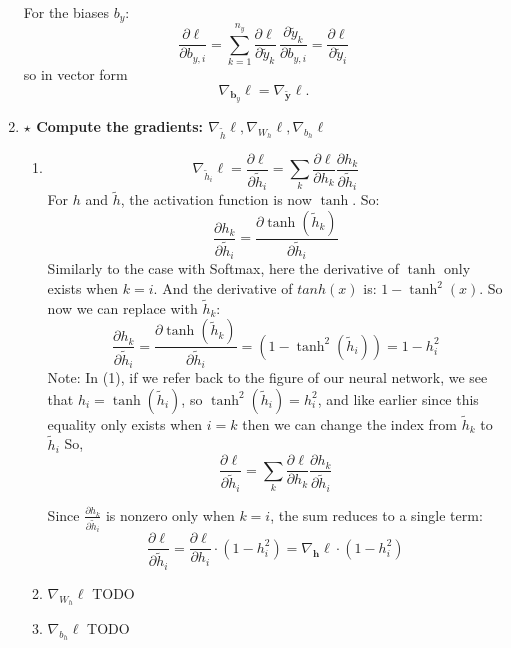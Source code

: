 \documentclass[12pt,a4paper]{article}
\begin{document}
\begin{enumerate}[resume]
    For the biases $b_y$:
    \[
    \frac{\partial \ell}{\partial b_{y,i}}
    = \sum_{k=1}^{n_y} \frac{\partial \ell}{\partial \tilde{y}_k}\,\frac{\partial \tilde{y}_k}{\partial b_{y,i}}
    = \frac{\partial \ell}{\partial \tilde{y}_i}
    \]
    so in vector form
    \[
    \nabla_{\mathbf{b}_y}\ell = \nabla_{\tilde{\mathbf{y}}}\ell .
    \]

    \item \textbf{$\star$ Compute the gradients: $\nabla_{\tilde{h}}\ell, \nabla_{W_h}\ell, \nabla_{b_h}\ell$}

    \begin{enumerate}
        \item \[ 
        \nabla_{\tilde{h}_i}\ell = \frac{\partial \ell}{\partial \tilde{h}_i}  
        = \sum_{k} \frac{\partial \ell}{\partial h_k} \frac{\partial h_k}{\partial \tilde{h}_i}
        \]
        For $h$ and $\tilde{h}$, the activation function is now $\tanh$. So:
        \[
        \frac{\partial h_k}{\partial \tilde{h}_i} = \frac{\partial \tanh(\tilde{h}_k)}{\partial \tilde{h}_i}
        \]
        Similarly to the case with Softmax, here the derivative of $\tanh$ only exists when $k=i$. And the derivative
        of $tanh(x)$ is: $1 - \tanh^2(x)$.
        So now we can replace with $\tilde{h}_k$:
        \[
        \frac{\partial h_k}{\partial \tilde{h}_i}
        = \frac{\partial \tanh(\tilde{h}_k)}{\partial \tilde{h}_i} \tag{1}
        = (1 - \tanh^2(\tilde{h}_i))
        = 1 - h_i^2
        \]
        Note: In (1), if we refer back to the figure of our neural network, we see that $h_i = \tanh(\tilde{h}_i)$, so $\tanh^2(\tilde{h}_i) = h_i^2$, 
        and like earlier since this equality only exists when $i=k$ then we can change the index 
        from $\tilde{h}_k$ to $\tilde{h}_i$ \newline
        So,
        \[
        \frac{\partial \ell}{\partial \tilde{h}_i}
        = \sum_k \frac{\partial \ell}{\partial h_k} \frac{\partial h_k}{\partial \tilde{h}_i}
        \]

        Since $\frac{\partial h_k}{\partial \tilde{h}_i}$ is nonzero only when $k = i$, the sum reduces to a single term:
        \[
        \frac{\partial \ell}{\partial \tilde{h}_i}
        = \frac{\partial \ell}{\partial h_i} \cdot (1 - h_i^2) 
        = \nabla_{\mathbf{h}}\ell \cdot (1 - h_i^2) 
        \]
        
        \item $\nabla_{W_h}\ell$ TODO
        \item $\nabla_{b_h}\ell$ TODO
    \end{enumerate}

\end{enumerate}
\end{document}
